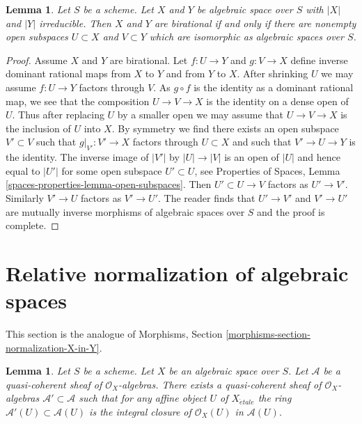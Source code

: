\documentclass{stacks-project}
\theoremstyle{plain}
\newtheorem{lemma}[subsection]{Lemma}
\theoremstyle{definition}
\theoremstyle{remark}
\numberwithin{equation}{subsection}
\def\etale{{\acute{e}tale}}
\begin{document}
\begin{lemma}
\label{lemma-birational}
Let $S$ be a scheme. Let $X$ and $Y$ be algebraic
space over $S$ with $|X|$ and $|Y|$ irreducible.
Then $X$ and $Y$ are birational if and only if
there are nonempty open subspaces $U \subset X$ and $V \subset Y$
which are isomorphic as algebraic spaces over $S$.
\end{lemma}

\begin{proof}
Assume $X$ and $Y$ are birational. Let $f : U \to Y$ and $g : V \to X$
define inverse dominant rational maps from $X$ to $Y$ and from $Y$ to $X$.
After shrinking $U$ we may assume $f : U \to Y$ factors through $V$.
As $g \circ f$ is the identity as a dominant rational map, we see that
the composition $U \to V \to X$ is the identity on a dense open of $U$.
Thus after replacing $U$ by a smaller open we may assume that
$U \to V \to X$ is the inclusion of $U$ into $X$.
By symmetry we find there exists an open subspace $V' \subset V$
such that $g|_{V'} : V' \to X$ factors through $U \subset X$
and such that $V' \to U \to Y$ is the identity.
The inverse image of $|V'|$ by $|U| \to |V|$ is an open of $|U|$
and hence equal to $|U'|$ for some open subspace $U' \subset U$, see
Properties of Spaces, Lemma \ref{spaces-properties-lemma-open-subspaces}.
Then $U' \subset U \to V$ factors as $U' \to V'$.
Similarly $V' \to U$ factors as $V' \to U'$.
The reader finds that $U' \to V'$
and $V' \to U'$ are mutually inverse
morphisms of algebraic spaces over $S$
and the proof is complete.
\end{proof}









\section{Relative normalization of algebraic spaces}
\label{section-normalization-X-in-Y}

\noindent
This section is the analogue of
Morphisms, Section \ref{morphisms-section-normalization-X-in-Y}.

\begin{lemma}
\label{lemma-integral-closure}
Let $S$ be a scheme. Let $X$ be an algebraic space over $S$.
Let $\mathcal{A}$ be a quasi-coherent sheaf of $\mathcal{O}_X$-algebras.
There exists a quasi-coherent sheaf of $\mathcal{O}_X$-algebras
$\mathcal{A}' \subset \mathcal{A}$ such that
for any affine object $U$ of $X_\etale$ the ring
$\mathcal{A}'(U) \subset \mathcal{A}(U)$ is
the integral closure of $\mathcal{O}_X(U)$ in $\mathcal{A}(U)$.
\end{lemma}
\end{document}
